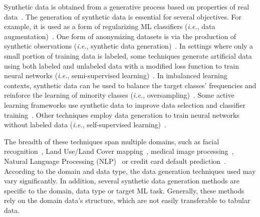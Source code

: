Synthetic data is obtained from a generative process based on properties of
real data~\cite{assefa2020generating}. The generation of synthetic data is
essential for several objectives. For example, it is used as a form of
regularizing ML classifiers (\textit{i.e.}, data
augmentation)~\cite{wang2021regularizing}. One form of anonymizing datasets is
via the production of synthetic observations (\textit{i.e.}, synthetic data
generation)~\cite{patki2016synthetic}. In settings where only a small portion
of training data is labeled, some techniques generate artificial data using
both labeled and unlabeled data with a modified loss function to train neural
networks (\textit{i.e.}, semi-supervised learning)~\cite{laine2017temporal}.
In imbalanced learning contexts, synthetic data can be used to balance the
target classes' frequencies and reinforce the learning of minority classes
(\textit{i.e.}, oversampling)~\cite{Fonseca2021}. Some active
learning frameworks use synthetic data to improve data selection and
classifier training~\cite{Kim2021}. Other techniques employ data
generation to train neural networks without labeled data (\textit{i.e.},
self-supervised learning)~\cite{grill2020bootstrap}.

The breadth of these techniques span multiple domains, such as facial
recognition~\cite{lv2017data}, Land Use/Land Cover
mapping~\cite{Douzas2019rs}, medical image
processing~\cite{yi2019generative}, Natural Language Processing
(NLP)~\cite{feng2021survey} or credit card default
prediction~\cite{alam2020investigation}. According to the domain and data
type, the data generation techniques used may vary significantly. In addition,
several synthetic data generation methods are specific to the domain, data
type or target ML task. Generally, these methods rely on the domain data's
structure, which are not easily transferable to tabular data.

